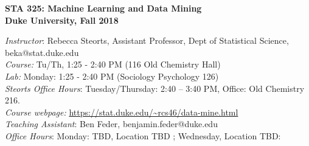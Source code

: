 \documentclass[11pt]{article}
\date{}
\begin{document}

\begin{center}
{\Large\bf STA 325: Machine Learning and Data Mining} \\

{\Large\bf Duke University, Fall 2018} \\
\end{center}



\emph{Instructor}: Rebecca Steorts,  Assistant Professor, Dept of Statistical Science, beka@stat.duke.edu\\
\emph{Course:} Tu/Th, 1:25 - 2:40 PM (116 Old Chemistry Hall)\\
\emph{Lab:} Monday: 1:25 - 2:40 PM (Sociology Psychology 126) \\
\emph{Steorts Office Hours}: Tuesday/Thursday: 2:40 -- 3:40 PM, Office: Old Chemistry 216.\\
\emph{Course webpage:} \url{https://stat.duke.edu/~rcs46/data-mine.html} \\

\emph{Teaching Assistant}: Ben Feder, benjamin.feder@duke.edu\\
\emph{Office Hours}: Monday: TBD, Location TBD ; Wednesday, Location TBD:  \\

%
\end{document}
